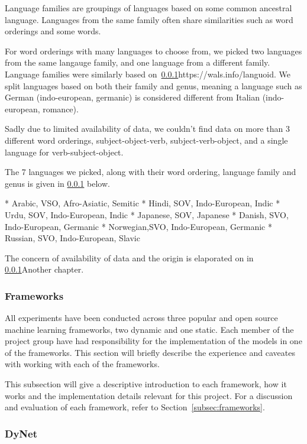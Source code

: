 Language families are groupings of languages based on some common ancestral
language. Languages from the same family often share similarities such as word
orderings and some words. 

For word orderings with many languages to choose from, we picked two languages
from the same langauge family, and one language from a different family.
Language families were similarly based on~\ref{}{https://wals.info/languoid}. We
split languages based on both their family and genus, meaning a language such as
German (indo-european, germanic) is considered different from Italian
(indo-european, romance).

Sadly due to limited availability of data, we couldn't find data on more than 3
different word orderings, subject-object-verb, subject-verb-object, and a single
language for verb-subject-object. 

The 7 languages we picked, along with their word ordering, language family and
genus is given in \ref{} below.

* Arabic,   VSO, Afro-Asiatic, Semitic 
* Hindi,    SOV, Indo-European, Indic
* Urdu,     SOV, Indo-European, Indic
* Japanese, SOV, Japanese
* Danish,   SVO, Indo-European, Germanic
* Norwegian,SVO, Indo-European, Germanic
* Russian,  SVO, Indo-European, Slavic

The concern of availability of data and the origin is elaporated on in
\ref{}{Another chapter}.


\subsubsection{Frameworks}

All experiments have been conducted across three popular and open source machine
learning frameworks, two dynamic and one static. Each member of the project
group have had responsibility for the implementation of the models in one of the
frameworks. This section will briefly describe the experience and caveates with
working with each of the frameworks.

This subsection will give a descriptive introduction to each framework, how it
works and the implementation details relevant for this project. For a discussion
and evaluation of each framework, refer to Section~\ref{subsec:frameworks}.


\subsubsection*{DyNet}

